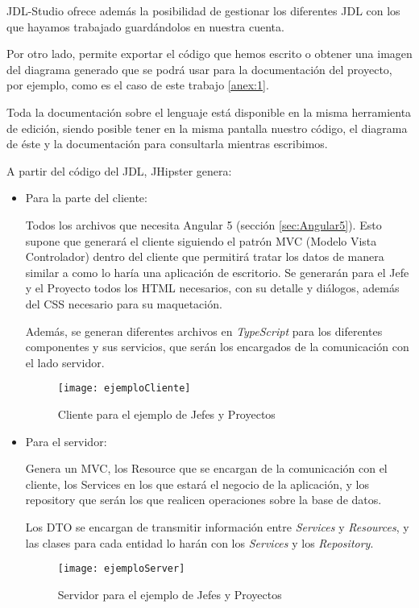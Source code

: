 JDL-Studio ofrece además la posibilidad de gestionar los diferentes JDL con los que hayamos trabajado guardándolos en nuestra cuenta.

Por otro lado, permite exportar el código que hemos escrito o obtener una imagen del diagrama generado que se podrá usar para la documentación del proyecto, por ejemplo, como es el caso de este trabajo \ref{anex:1}.

Toda la documentación sobre el lenguaje está disponible en la misma herramienta de edición, siendo posible tener en la misma pantalla nuestro código, el diagrama de éste y la documentación para consultarla mientras escribimos.

A partir del código del JDL, JHipster genera:
\begin{itemize}
\item Para la parte del cliente: 

Todos los archivos que necesita Angular 5 (sección \ref{sec:Angular5}). Esto supone que generará el cliente siguiendo el patrón MVC (Modelo Vista Controlador) dentro del cliente que permitirá tratar los datos de manera similar a como lo haría una aplicación de escritorio. Se generarán para el Jefe y el Proyecto todos los HTML necesarios, con su detalle y diálogos, además del CSS necesario para su maquetación. 

Además, se generan diferentes archivos en \emph{TypeScript} para los diferentes componentes y sus servicios, que serán los encargados de la comunicación con el lado servidor.

\begin{figure}[!h]
\begin{center}
\texttt{[image: ejemploCliente]}
\caption{Cliente para el ejemplo de Jefes y Proyectos}
\label{fig:ejemploCliente}
\end{center}
\end{figure}
\clearpage

\item Para el servidor: 

Genera un MVC, los Resource que se encargan de la comunicación con el cliente, los Services en los que estará el negocio de la aplicación, y los repository que serán los que realicen operaciones sobre la base de datos. 

Los DTO se encargan de transmitir información entre \emph{Services} y \emph{Resources}, y las clases para cada entidad  lo harán con los \emph{Services} y los \emph{Repository}.

\begin{figure}[!h]
\begin{center}
\texttt{[image: ejemploServer]}
\caption{Servidor para el ejemplo de Jefes y Proyectos}
\label{fig:ejemploServer}
\end{center}
\end{figure}


\end{itemize}
